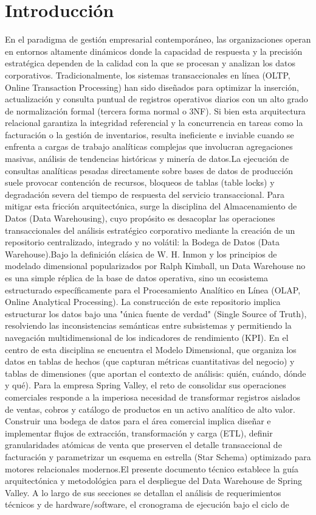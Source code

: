 \section{Introducción}
En el paradigma de gestión empresarial contemporáneo, las organizaciones operan en entornos altamente dinámicos donde la capacidad de respuesta y la precisión estratégica dependen de la calidad con la que se procesan y analizan los datos corporativos. Tradicionalmente, los sistemas transaccionales en línea (OLTP, Online Transaction Processing) han sido diseñados para optimizar la inserción, actualización y consulta puntual de registros operativos diarios con un alto grado de normalización formal (tercera forma normal o 3NF). Si bien esta arquitectura relacional garantiza la integridad referencial y la concurrencia en tareas como la facturación o la gestión de inventarios, resulta ineficiente e inviable cuando se enfrenta a cargas de trabajo analíticas complejas que involucran agregaciones masivas, análisis de tendencias históricas y minería de datos.La ejecución de consultas analíticas pesadas directamente sobre bases de datos de producción suele provocar contención de recursos, bloqueos de tablas (table locks) y degradación severa del tiempo de respuesta del servicio transaccional. Para mitigar esta fricción arquitectónica, surge la disciplina del Almacenamiento de Datos (Data Warehousing), cuyo propósito es desacoplar las operaciones transaccionales del análisis estratégico corporativo mediante la creación de un repositorio centralizado, integrado y no volátil: la Bodega de Datos (Data Warehouse).Bajo la definición clásica de W. H. Inmon y los principios de modelado dimensional popularizados por Ralph Kimball, un Data Warehouse no es una simple réplica de la base de datos operativa, sino un ecosistema estructurado específicamente para el Procesamiento Analítico en Línea (OLAP, Online Analytical Processing). La construcción de este repositorio implica estructurar los datos bajo una "única fuente de verdad" (Single Source of Truth), resolviendo las inconsistencias semánticas entre subsistemas y permitiendo la navegación multidimensional de los indicadores de rendimiento (KPI). En el centro de esta disciplina se encuentra el Modelo Dimensional, que organiza los datos en tablas de hechos (que capturan métricas cuantitativas del negocio) y tablas de dimensiones (que aportan el contexto de análisis: quién, cuándo, dónde y qué).   Para la empresa Spring Valley, el reto de consolidar sus operaciones comerciales responde a la imperiosa necesidad de transformar registros aislados de ventas, cobros y catálogo de productos en un activo analítico de alto valor. Construir una bodega de datos para el área comercial implica diseñar e implementar flujos de extracción, transformación y carga (ETL), definir granularidades atómicas de venta que preserven el detalle transaccional de facturación y parametrizar un esquema en estrella (Star Schema) optimizado para motores relacionales modernos.El presente documento técnico establece la guía arquitectónica y metodológica para el despliegue del Data Warehouse de Spring Valley. A lo largo de sus secciones se detallan el análisis de requerimientos técnicos y de hardware/software, el cronograma de ejecución bajo el ciclo de 